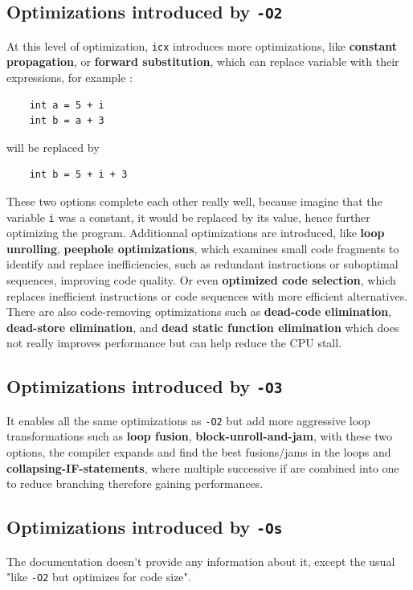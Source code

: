 \documentclass{rapport}
\newcommand{\icx}{\texttt{icx} }
\newcommand{\optitwo}{\texttt{-O2} }
\newcommand{\optithree}{\texttt{-O3} }
\newcommand{\optisize}{\texttt{-Os} }
\begin{document}
\subsection*{Optimizations introduced by \optitwo}
At this level of optimization, \icx introduces more optimizations, like \textbf{constant propagation}, or \textbf{forward substitution}, which can replace variable with their expressions, for example : 
\begin{verbatim}
    int a = 5 + i
    int b = a + 3
\end{verbatim}
will be replaced by
\begin{verbatim}
    int b = 5 + i + 3
\end{verbatim}
These two options complete each other really well, because imagine that the variable \texttt{i} was a constant, it would be replaced by its value, hence further optimizing the program.
\newline\newline
Additionnal optimizations are introduced, like \textbf{loop unrolling}, \textbf{peephole optimizations}, which examines small code fragments to identify and replace inefficiencies,
such as redundant instructions or suboptimal sequences, improving code quality. Or even \textbf{optimized code selection}, which replaces inefficient instructions or code sequences with 
more efficient alternatives.
\newline\newline
There are also code-removing optimizations such as \textbf{dead-code elimination}, \textbf{dead-store elimination}, and \textbf{dead static function elimination} which does not really improves performance but can help reduce the CPU stall.

\subsection*{Optimizations introduced by \optithree}
It enables all the same optimizations as \optitwo but add more aggressive loop transformations such as \textbf{loop fusion}, \textbf{block-unroll-and-jam}, with these two options, the compiler expands and find the best fusions/jams in the loops and \textbf{collapsing-IF-statements}, where multiple successive if are combined into one to reduce branching therefore gaining performances.

\subsection*{Optimizations introduced by \optisize}
The documentation doesn't provide any information about it, except the usual "like \optitwo but optimizes for code size".
\end{document}
